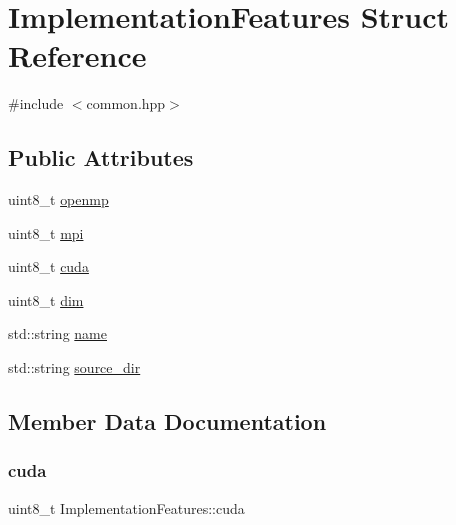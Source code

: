 \hypertarget{structImplementationFeatures}{}\section{Implementation\+Features Struct Reference}
\label{structImplementationFeatures}


{\ttfamily \#include $<$common.\+hpp$>$}

\subsection*{Public Attributes}
\begin{DoxyCompactItemize}
\item 
uint8\+\_\+t \mbox{\hyperlink{structImplementationFeatures_a38b97cc0b2f3ea9db019845264fc060b}{openmp}}
\item 
uint8\+\_\+t \mbox{\hyperlink{structImplementationFeatures_a87a6ded1fc05396de42c11b17d41beca}{mpi}}
\item 
uint8\+\_\+t \mbox{\hyperlink{structImplementationFeatures_ac8156c774edb85175df22ff7f31dda44}{cuda}}
\item 
uint8\+\_\+t \mbox{\hyperlink{structImplementationFeatures_aaeaaaf6e801ac06863ba363591e938d7}{dim}}
\item 
std\+::string \mbox{\hyperlink{structImplementationFeatures_a7b7fb4c4e8fbf262d6697b8c25a17b5f}{name}}
\item 
std\+::string \mbox{\hyperlink{structImplementationFeatures_afe154ad26b28217f95c4cc74d7112049}{source\+\_\+dir}}
\end{DoxyCompactItemize}


\subsection{Member Data Documentation}
\mbox{\label{structImplementationFeatures_ac8156c774edb85175df22ff7f31dda44}} 
\subsubsection{\texorpdfstring{cuda}{cuda}}
{\footnotesize\ttfamily uint8\+\_\+t Implementation\+Features\+::cuda}

\mbox{\label{structImplementationFeatures_aaeaaaf6e801ac06863ba363591e938d7}} 
